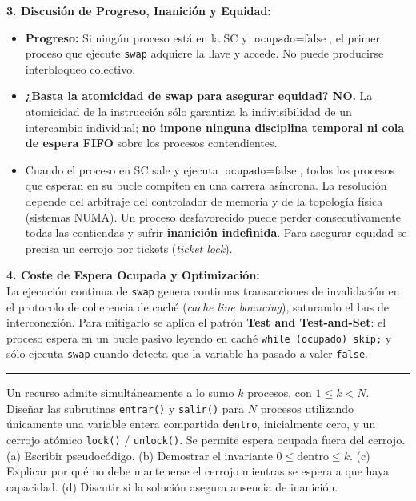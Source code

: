 \documentclass[11pt,a4paper,twoside,openright]{report}
\begin{document}
\begin{solucion}
\textbf{3. Discusión de Progreso, Inanición y Equidad:}\\
\begin{itemize}[leftmargin=*]
    \item \textbf{Progreso:} Si ningún proceso está en la SC y $\texttt{ocupado} = \text{false}$, el primer proceso que ejecute \texttt{swap} adquiere la llave y accede. No puede producirse interbloqueo colectivo.
    \item \textbf{¿Basta la atomicidad de swap para asegurar equidad? NO.}
    La atomicidad de la instrucción sólo garantiza la indivisibilidad de un intercambio individual; \textbf{no impone ninguna disciplina temporal ni cola de espera FIFO} sobre los procesos contendientes.
    \item Cuando el proceso en SC sale y ejecuta $\texttt{ocupado} = \text{false}$, todos los procesos que esperan en su bucle compiten en una carrera asíncrona. La resolución depende del arbitraje del controlador de memoria y de la topología física (sistemas NUMA). Un proceso desfavorecido puede perder consecutivamente todas las contiendas y sufrir \textbf{inanición indefinida}. Para asegurar equidad se precisa un cerrojo por tickets (\emph{ticket lock}).
\end{itemize}

\textbf{4. Coste de Espera Ocupada y Optimización:}\\
La ejecución continua de \texttt{swap} genera continuas transacciones de invalidación en el protocolo de coherencia de caché (\emph{cache line bouncing}), saturando el bus de interconexión. Para mitigarlo se aplica el patrón \textbf{Test and Test-and-Set}: el proceso espera en un bucle pasivo leyendo en caché \texttt{while (ocupado) skip;} y sólo ejecuta \texttt{swap} cuando detecta que la variable ha pasado a valer \texttt{false}.
\end{solucion}

\vspace{15pt}
\hrule
\vspace{15pt}

\begin{ejercicio}
Un recurso admite simultáneamente a lo sumo $k$ procesos, con $1 \le k < N$. Diseñar las subrutinas \texttt{entrar()} y \texttt{salir()} para $N$ procesos utilizando únicamente una variable entera compartida \texttt{dentro}, inicialmente cero, y un cerrojo atómico \texttt{lock()} / \texttt{unlock()}. Se permite espera ocupada fuera del cerrojo. (a) Escribir pseudocódigo. (b) Demostrar el invariante $0 \le \text{dentro} \le k$. (c) Explicar por qué no debe mantenerse el cerrojo mientras se espera a que haya capacidad. (d) Discutir si la solución asegura ausencia de inanición.
\end{ejercicio}
\end{document}
